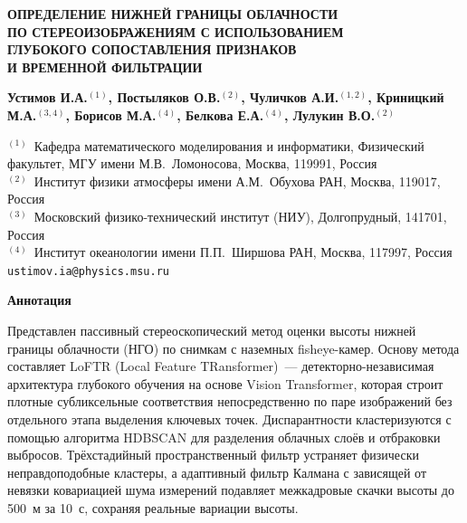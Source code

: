 \documentclass[11pt]{article}
\date{}
\begin{document}
\begin{titlepage}

\begin{center}
\large
\textbf{ОПРЕДЕЛЕНИЕ НИЖНЕЙ ГРАНИЦЫ ОБЛАЧНОСТИ\\ ПО СТЕРЕОИЗОБРАЖЕНИЯМ С ИСПОЛЬЗОВАНИЕМ\\ ГЛУБОКОГО СОПОСТАВЛЕНИЯ ПРИЗНАКОВ\\ И ВРЕМЕННОЙ ФИЛЬТРАЦИИ}

\vspace{10mm}

\large
\textbf{Устимов И.А.$^{(1)}$, Постыляков О.В.$^{(2)}$, Чуличков А.И.$^{(1,2)}$, Криницкий М.А.$^{(3,4)}$, Борисов М.А.$^{(4)}$, Белкова Е.А.$^{(4)}$, Лулукин В.О.$^{(2)}$}

\vspace{5mm}

\normalsize
$^{(1)}$~Кафедра математического моделирования и информатики, Физический факультет, МГУ имени М.В.~Ломоносова, Москва, 119991, Россия\\
$^{(2)}$~Институт физики атмосферы имени А.М.~Обухова РАН, Москва, 119017, Россия\\
$^{(3)}$~Московский физико-технический институт (НИУ), Долгопрудный, 141701, Россия\\
$^{(4)}$~Институт океанологии имени П.П.~Ширшова РАН, Москва, 117997, Россия\\
\texttt{ustimov.ia@physics.msu.ru}

\vspace{20mm}

\textbf{Аннотация}
\end{center}

\vspace{5mm}

Представлен пассивный стереоскопический метод оценки высоты нижней границы облачности (НГО) по снимкам с наземных fisheye-камер. Основу метода составляет LoFTR (Local Feature TRansformer)~--- детекторно-независимая архитектура глубокого обучения на основе Vision Transformer, которая строит плотные субликсельные соответствия непосредственно по паре изображений без отдельного этапа выделения ключевых точек. Диспарантности кластеризуются с помощью алгоритма HDBSCAN для разделения облачных слоёв и отбраковки выбросов. Трёхстадийный пространственный фильтр устраняет физически неправдоподобные кластеры, а адаптивный фильтр Калмана с зависящей от невязки ковариацией шума измерений подавляет межкадровые скачки высоты до 500~м за 10~с, сохраняя реальные вариации высоты.


\end{titlepage}
\end{document}
